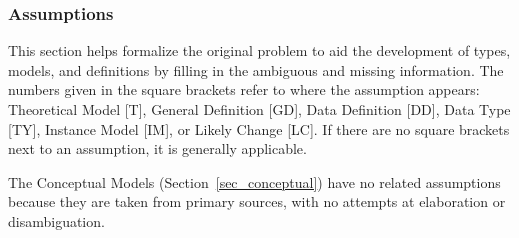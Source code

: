 \subsubsection{Assumptions}\label{sec_assumptions}
This section helps formalize the original problem to aid the development of
types, models, and definitions by filling in the ambiguous and missing
information. The numbers given in the square brackets refer to where the
assumption appears: Theoretical Model [T], General Definition [GD], Data
Definition [DD], Data Type [TY], Instance Model [IM], or Likely Change [LC]. If
there are no square brackets next to an assumption, it is generally applicable.

The Conceptual Models (Section~\ref{sec_conceptual}) have no related
assumptions because they are taken from primary sources, with no attempts at
elaboration or disambiguation.

